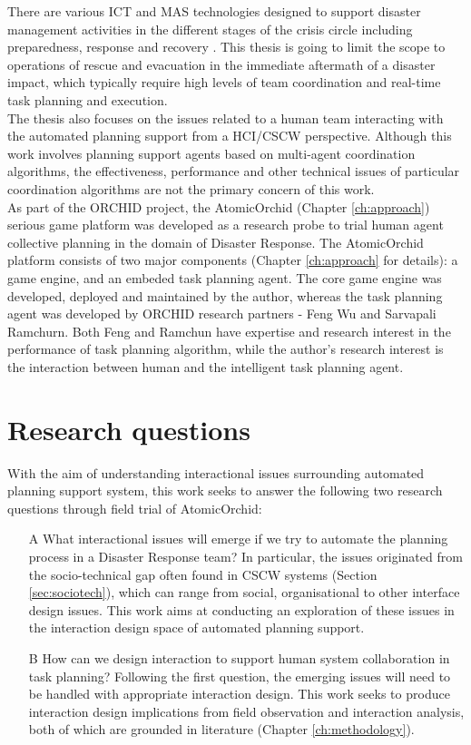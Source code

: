 There are various \ac{ICT} and \ac{MAS} technologies designed to support disaster management activities in the different stages of the crisis circle including preparedness, response and recovery \citep{Wattegama2012}. This thesis is going to limit the scope to operations of rescue and evacuation in the immediate aftermath of a disaster impact, which typically require high levels of team coordination and real-time task planning and execution.\\ 

The thesis also focuses on the issues related to a human team interacting with the automated planning support from a \ac{HCI}/\ac{CSCW} perspective. Although this work involves planning support agents based on multi-agent coordination algorithms, the effectiveness, performance and other technical issues of particular coordination algorithms are not the primary concern of this work.\\

As part of the ORCHID project, the AtomicOrchid (Chapter \ref{ch:approach}) serious game platform was developed as a research probe to trial human agent collective planning in the domain of Disaster Response. The AtomicOrchid platform consists of two major components (Chapter \ref{ch:approach} for details): a game engine, and an embeded task planning agent. The core game engine was developed, deployed and maintained by the author, whereas the task planning agent was developed by ORCHID research partners - Feng Wu and Sarvapali Ramchurn. Both Feng and Ramchun have expertise and research interest in the performance of task planning algorithm, while the author's research interest is the interaction between human and the intelligent task planning agent. \\

\section{Research questions}
With the aim of understanding interactional issues surrounding automated planning support system, this work seeks to answer the following two research questions through field trial of AtomicOrchid:

\begin{enumerate}
\item[A] What interactional issues will emerge if we try to automate the planning process in a Disaster Response team? In particular, the issues originated from the socio-technical gap often found in \ac{CSCW} systems (Section \ref{sec:sociotech}), which can range from social, organisational to other interface design issues. This work aims at conducting an exploration of these issues in the interaction design space of automated planning support.

\item[B] How can we design interaction to support human system collaboration in task planning?
Following the first question, the emerging issues will need to be handled with appropriate interaction design. This work seeks to produce interaction design implications from field observation and interaction analysis, both of which are grounded in literature (Chapter \ref{ch:methodology}).
\end{enumerate}

